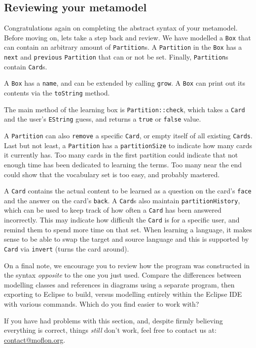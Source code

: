 \newpage 
\genHeader
\subsection{Reviewing your metamodel}
\hypertarget{static review}{}

Congratulations again on completing the abstract syntax of your metamodel. Before moving on, lets take a step back and review. We have modelled a \texttt{Box}
that can contain an arbitrary amount of \texttt{Partition}s. A \texttt{Partition} in the \texttt{Box} has a \texttt{next} and \texttt{previous} \texttt{Partition}
that can or not be set. Finally, \texttt{Partition}s contain \texttt{Card}s.

A \texttt{Box} has a \texttt{name}, and can be extended by calling \texttt{grow}. A \texttt{Box} can print out its contents via the \texttt{toString} method.

The main method of the learning box is \texttt{Partition::check}, which takes a \texttt{Card} and the user's \texttt{EString} guess, and returns a \texttt{true}
or \texttt{false} value.

A \texttt{Partition} can also \texttt{remove} a specific \texttt{Card}, or empty itself of all  existing \texttt{Cards}. Last but not least, a
\texttt{Partition} has a \texttt{partitionSize} to indicate how many cards it currently has. Too many cards in the first partition could indicate that not
enough time has been dedicated to learning the terms. Too many near the end could show that the vocabulary set is too easy, and probably mastered.

A \texttt{Card} contains the actual content to be learned as a question on the card's \texttt{face} and the answer on the card's \texttt{back}. A \texttt{Card}s
also maintain \texttt{partition\-History}, which can be used to keep track of how often a \texttt{Card} has been answered incorrectly.
This may indicate how difficult the \texttt{Card} is for a specific user, and remind them to spend more time on that set. When learning a language, it makes
sense to be able to swap the target and source language and this is supported by \texttt{Card} via \texttt{invert} (turns the card around).

On a final note, we encourage you to review how the program was constructed in the syntax \emph{opposite} to the one you just used. Compare the differences
between modelling classes and references in diagrams using a separate program, then exporting to Eclipse to build, versus modelling entirely within the Eclipse
IDE with various commands. Which do you find easier to work with?

If you have had problems with this section, and, despite firmly believing everything is correct, things \emph{still} don't work, feel free to contact us at:\\ 
\href{mailto:contact@moflon.org}{contact@moflon.org}.

